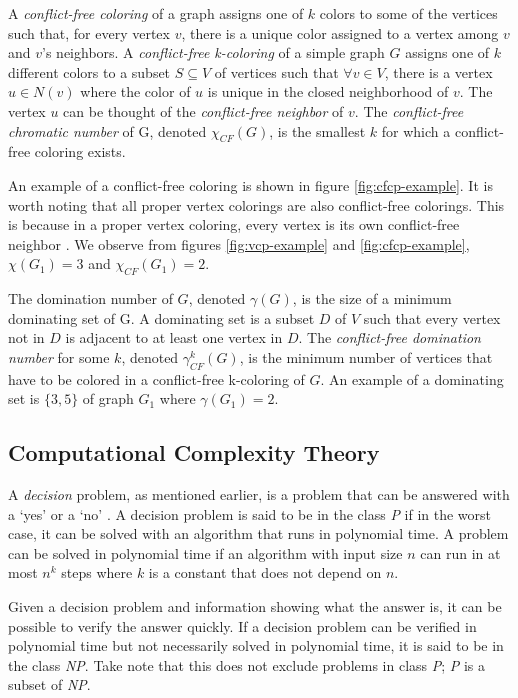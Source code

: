 \documentclass{sig-alternate}
\begin{document}
A \emph{conflict-free coloring} of a graph assigns one of $k$ colors to some of the vertices such that, for every vertex $v$, there is a unique color assigned to a vertex among $v$ and $v$'s neighbors. A \emph{conflict-free k-coloring} of a simple graph $G$ assigns one of $k$ different colors to a subset $S \subseteq V$ of vertices such that $\forall v \in V$, there is a vertex $u \in N(v)$ where the color of $u$ is unique in the closed neighborhood of $v$. The vertex $u$ can be thought of the \emph{conflict-free neighbor} of $v$. The \emph{conflict-free chromatic number} of G, denoted $\chi_{CF}(G)$, is the smallest $k$ for which a conflict-free coloring exists. \cite{abel2017three}

An example of a conflict-free coloring is shown in figure \ref{fig:cfcp-example}. It is worth noting that all proper vertex colorings are also conflict-free colorings. This is because in a proper vertex coloring, every vertex is its own conflict-free neighbor \cite{abel2017three}. We observe from figures \ref{fig:vcp-example} and \ref{fig:cfcp-example}, $\chi(G_1) = 3$ and $\chi_{CF}(G_1) = 2$.

The domination number of $G$, denoted $\gamma(G)$, is the size of a minimum dominating set of G. A dominating set is a subset $D$ of $V$ such that every vertex not in $D$ is adjacent to at least one vertex in $D$. The \emph{conflict-free domination number} for some $k$, denoted $\gamma_{CF}^k(G)$, is the minimum number of vertices that have to be colored in a conflict-free k-coloring of $G$. An example of a dominating set is $\{3, 5\}$ of graph $G_1$ where $\gamma(G_1) = 2$.

\subsection{Computational Complexity Theory}
\label{sec:complexitytheory}
A \emph{decision} problem, as mentioned earlier, is a problem that can be answered with a `yes' or a `no' \cite{sipser2006introduction}. A decision problem is said to be in the class \emph{P} if in the worst case, it can be solved with an algorithm that runs in polynomial time. A problem can be solved in polynomial time if an algorithm with input size $n$ can run in at most $n^k$ steps where $k$ is a constant that does not depend on $n$.

Given a decision problem and information showing what the answer is, it can be possible to verify the answer quickly. If a decision problem can be verified in polynomial time but not necessarily solved in polynomial time, it is said to be in the class \emph{NP}. Take note that this does not exclude problems in class \emph{P}; \emph{P} is a subset of \emph{NP}.
\end{document}
